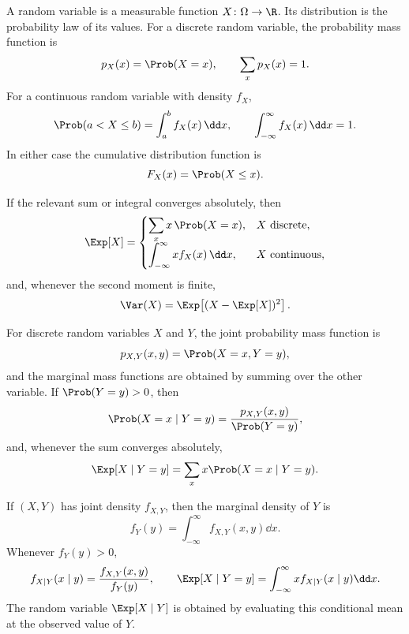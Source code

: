     \begin{definition}
        A random variable is a measurable function $X\colon \Omega\to\R$. Its
        distribution is the probability law of its values. For a discrete
        random variable, the probability mass function is
        \[
            p_X(x)=\Prob(X=x),
            \qquad
            \sum_x p_X(x)=1.
        \]
        For a continuous random variable with density $f_X$,
        \[
            \Prob(a<X\leq b)=\int_a^b f_X(x)\,\dd x,
            \qquad
            \int_{-\infty}^{\infty}f_X(x)\,\dd x=1.
        \]
        In either case the cumulative distribution function is
        \[
            F_X(x)=\Prob(X\leq x).
        \]
    \end{definition}

    \begin{definition}
        If the relevant sum or integral converges absolutely, then
        \[
            \Exp[X]
            =
            \begin{cases}
                \displaystyle\sum_x x\,\Prob(X=x), & X\text{ discrete},\\[1mm]
                \displaystyle\int_{-\infty}^{\infty}x f_X(x)\,\dd x,
                & X\text{ continuous},
            \end{cases}
        \]
        and, whenever the second moment is finite,
        \[
            \Var(X)=\Exp\!\left[(X-\Exp[X])^2\right].
        \]
    \end{definition}

    \begin{definition}
        For discrete random variables $X$ and $Y$, the joint probability mass
        function is
        \[
            p_{X,Y}(x,y)=\Prob(X=x,Y=y),
        \]
        and the marginal mass functions are obtained by summing over the other
        variable. If $\Prob(Y=y)>0$, then
        \[
            \Prob(X=x\mid Y=y)
            =
            \frac{p_{X,Y}(x,y)}{\Prob(Y=y)},
        \]
        and, whenever the sum converges absolutely,
        \[
            \Exp[X\mid Y=y]
            =
            \sum_x x\Prob(X=x\mid Y=y).
        \]

        If $(X,Y)$ has joint density $f_{X,Y}$, then the marginal density of
        $Y$ is
        \[
            f_Y(y)=\int_{-\infty}^{\infty}f_{X,Y}(x,y)\dd x.
        \]
        Whenever $f_Y(y)>0$,
        \[
            f_{X\mid Y}(x\mid y)
            =
            \frac{f_{X,Y}(x,y)}{f_Y(y)},
            \qquad
            \Exp[X\mid Y=y]
            =
            \int_{-\infty}^{\infty}x f_{X\mid Y}(x\mid y)\dd x.
        \]
        The random variable $\Exp[X\mid Y]$ is obtained by evaluating this
        conditional mean at the observed value of $Y$.
    \end{definition}

